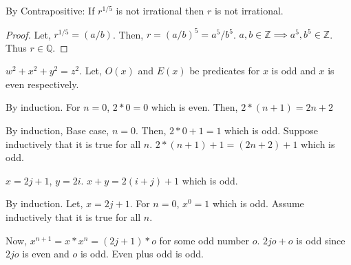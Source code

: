 \documentclass[titlepage,12pt]{book}
\begin{document}
\begin{solution}
    By Contrapositive: If $r^{1/5}$ is not irrational then $r$ is not irrational.
    \begin{proof}
        Let, $r^{1/5} = (a/b)$. Then, $r = (a/b)^{5} = a^{5}/b^{5}$.
        $a, b \in \mathbb{Z} \implies a^{5}, b^{5} \in \mathbb{Z}$.
        Thus $r \in \mathbb{Q}$.
    \end{proof}
\end{solution}

\begin{solution}
    $w^{2} + x^{2} + y^{2} = z^{2}$.
    Let, $O(x)$ and $E(x)$ be predicates for $x$ is odd and $x$ is even respectively.
    \begin{corol}
        By induction.
        For $n = 0$, $2 * 0 = 0$ which is even.
        Then, $2 * (n + 1) = 2n + 2$
    \end{corol}
    \begin{corol}
        By induction,
        Base case, $n = 0$. Then, $2 * 0 + 1 = 1$ which is odd.
        Suppose inductively that it is true for all $n$.
        $2 * (n + 1) + 1 = (2n + 2) + 1$ which is odd.
    \end{corol}
    \begin{corol}
        $x = 2j + 1$, $y = 2i$.
        $x + y = 2(i + j) + 1$ which is odd.
    \end{corol}
    \begin{lemm}
        By induction. Let, $x = 2j + 1$.
        For $n = 0$, $x^{0} = 1$ which is odd.
        Assume inductively that it is true for all $n$.
        
        Now, $x^{n + 1} = x * x^{n} = (2j + 1) * o$ for some odd number $o$.
        $2jo + o$ is odd since $2jo$ is even and $o$ is odd. Even plus odd is odd.
    \end{lemm}
\end{solution}
\end{document}
